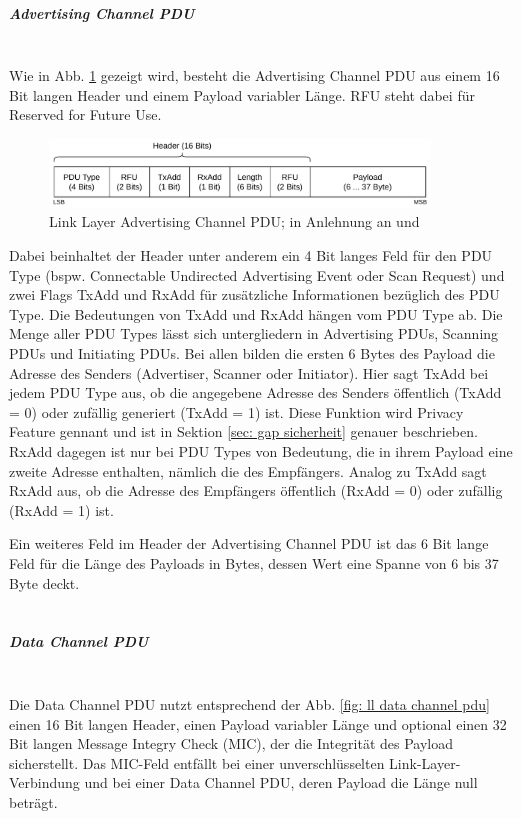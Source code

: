 \subparagraph{Advertising Channel PDU} \mbox{} \vspace{0.2cm} \\
Wie in Abb. \ref{fig: ll adv channel pdu} gezeigt wird, besteht die Advertising Channel PDU aus einem 16 Bit langen Header und einem Payload variabler Länge. RFU steht dabei für Reserved for Future Use.

\begin{figure}[H]
    \centering
    \includegraphics[width=0.9\textwidth]{graphics/link_layer_packetformat_pdu_adv.pdf}
    \caption[Link Layer Advertising Channel PDU]{Link Layer Advertising Channel PDU; in Anlehnung an \cite{BtSpec_fig_2201} und \cite{BtSpec_fig_2202}}
    \label{fig: ll adv channel pdu}
\end{figure}

Dabei beinhaltet der Header unter anderem ein 4 Bit langes Feld für den PDU Type (bspw. Connectable Undirected Advertising Event oder Scan Request) und zwei Flags TxAdd und RxAdd für zusätzliche Informationen bezüglich des PDU Type. Die Bedeutungen von TxAdd und RxAdd hängen vom PDU Type ab. Die Menge aller PDU Types lässt sich untergliedern in Advertising PDUs, Scanning PDUs und Initiating PDUs. Bei allen bilden die ersten 6 Bytes des Payload die Adresse des Senders (Advertiser, Scanner oder Initiator). Hier sagt TxAdd bei jedem PDU Type aus, ob die angegebene Adresse des Senders öffentlich (TxAdd = 0) oder zufällig generiert (TxAdd = 1) ist. Diese Funktion wird Privacy Feature gennant und ist in Sektion \ref{sec: gap sicherheit} genauer beschrieben. RxAdd dagegen ist nur bei PDU Types von Bedeutung, die in ihrem Payload eine zweite Adresse enthalten, nämlich die des Empfängers. Analog zu TxAdd sagt RxAdd aus, ob die Adresse des Empfängers öffentlich (RxAdd = 0) oder zufällig (RxAdd = 1) ist.

Ein weiteres Feld im Header der Advertising Channel PDU ist das 6 Bit lange Feld für die Länge des Payloads in Bytes, dessen Wert eine Spanne von 6 bis 37 Byte deckt. \cite{BtSpec4.0_2201-2208}
\\\\
\subparagraph{Data Channel PDU} \mbox{} \vspace{0.2cm} \\
Die Data Channel PDU nutzt entsprechend der Abb. \ref{fig: ll data channel pdu} einen 16 Bit langen Header, einen Payload variabler Länge und optional einen 32 Bit langen Message Integry Check (MIC), der die Integrität des Payload sicherstellt. Das MIC-Feld entfällt bei einer unverschlüsselten Link-Layer-Verbindung und bei einer Data Channel PDU, deren Payload die Länge null beträgt.

